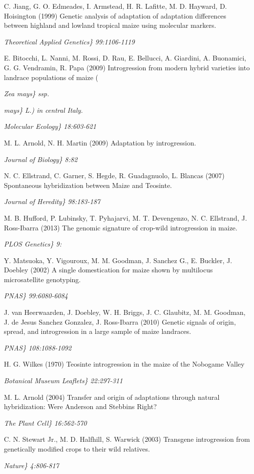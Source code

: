 \documentclass[11pt]{article}
\begin{document}
\begin{thebibliography}{1}
{{{{{{{{{{{{ C. Jiang, G. O. Edmeades, I. Armstead, H. R. Lafitte, M. D. Hayward, D. Hoisington (1999)
Genetic analysis of adaptation of adaptation differences between highland and lowland tropical maize using molecular markers.
{\em Theoretical Applied Genetics\} 99:1106-1119

 E. Bitocchi, L. Nanni, M. Rossi, D. Rau, E. Bellucci, A. Giardini, A. Buonamici, G. G. Vendramin, R. Papa (2009)
Introgression from modern hybrid varieties into landrace populations of maize ({\em Zea mays\} ssp. {\em mays\} L.) in central Italy.
{\em Molecular Ecology\} 18:603-621

 M. L. Arnold, N. H. Martin (2009)
Adaptation by introgression.
{\em Journal of Biology\} 8:82

 N. C. Ellstrand, C. Garner, S. Hegde, R. Guadagnuolo, L. Blancas (2007)
Spontaneous hybridization between Maize and Teosinte.
{\em Journal of Heredity\} 98:183-187

 M. B. Hufford, P. Lubinsky, T. Pyhajarvi, M. T. Devengenzo, N. C. Ellstrand, J. Ross-Ibarra (2013)
The genomic signature of crop-wild introgression in maize.
{\em PLOS Genetics\} 9:

 Y. Matsuoka, Y. Vigouroux, M. M. Goodman, J. Sanchez G., E. Buckler, J. Doebley (2002)
A single domestication for maize shown by multilocus microsatellite genotyping.
{\em PNAS\} 99:6080-6084

 J. van Heerwaarden, J. Doebley, W. H. Briggs, J. C. Glaubitz, M. M. Goodman, J. de Jesus Sanchez Gonzalez, J. Ross-Ibarra (2010)
Genetic signals of origin, spread, and introgression in a large sample of maize landraces.
{\em PNAS\} 108:1088-1092

 H. G. Wilkes (1970)
Teosinte introgression in the maize of the Nobogame Valley
{\em Botanical Museum Leaflets\} 22:297-311

 M. L. Arnold (2004)
Transfer and origin of adaptations through natural hybridization: Were Anderson and Stebbins Right?
{\em The Plant Cell\} 16:562-570

 C. N. Stewart Jr., M. D. Halfhill, S. Warwick (2003)
Transgene introgression from genetically modified crops to their wild relatives.
{\em Nature\} 4:806-817

}}}}}}}}}}}}}}}}}}}}}}}}
\end{thebibliography}
\end{document}
